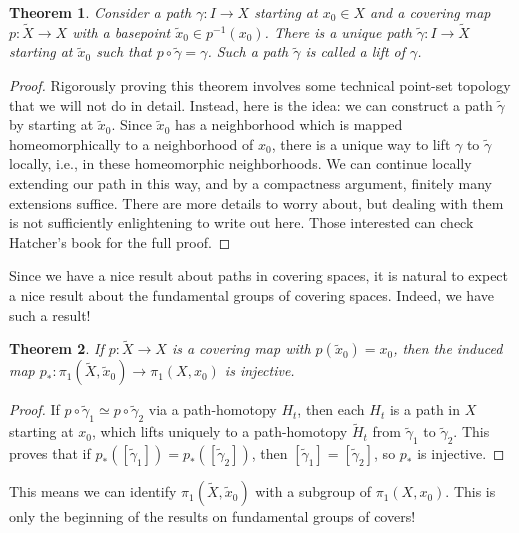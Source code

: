 \documentclass{article}
\newtheorem{thm}{Theorem}[section]
\theoremstyle{definition}
\theoremstyle{remark}
\numberwithin{figure}{section}
\begin{document}
\begin{thm}\label{thm:path lifting}
	Consider a path $\gamma : I \to X$ starting at $x_0 \in X$ and a covering map $p : \tilde X \to X$ with a basepoint $\tilde x_0 \in p^{-1}(x_0)$. There is a unique path $\tilde\gamma : I \to \tilde X$ starting at $\tilde x_0$ such that $p \circ \tilde\gamma = \gamma$. Such a path $\tilde\gamma$ is called a \emph{lift} of $\gamma$.
\end{thm}

\begin{proof}
	Rigorously proving this theorem involves some technical point-set topology that we will not do in detail. Instead, here is the idea: we can construct a path $\tilde\gamma$ by starting at $\tilde x_0$. Since $\tilde x_0$ has a neighborhood which is mapped homeomorphically to a neighborhood of $x_0$, there is a unique way to lift $\gamma$ to $\tilde\gamma$ locally, i.e., in these homeomorphic neighborhoods. We can continue locally extending our path in this way, and by a compactness argument, finitely many extensions suffice. There are more details to worry about, but dealing with them is not sufficiently enlightening to write out here. Those interested can check Hatcher's book for the full proof.
\end{proof}

Since we have a nice result about paths in covering spaces, it is natural to expect a nice result about the fundamental groups of covering spaces. Indeed, we have such a result!

\begin{thm}
	If $p : \tilde X \to X$ is a covering map with $p(\tilde x_0) = x_0$, then the induced map $p_* : \pi_1(\tilde X, \tilde x_0) \to \pi_1(X, x_0)$ is injective.
\end{thm}

\begin{proof}
	If $p \circ \tilde\gamma_1 \simeq p \circ \tilde\gamma_2$ via a path-homotopy $H_t$, then each $H_t$ is a path in $X$ starting at $x_0$, which lifts uniquely to a path-homotopy $\tilde H_t$ from $\tilde\gamma_1$ to $\tilde\gamma_2$. This proves that if $p_*([\tilde\gamma_1]) = p_*([\tilde\gamma_2])$, then $[\tilde\gamma_1] = [\tilde\gamma_2]$, so $p_*$ is injective.
\end{proof}

This means we can identify $\pi_1(\tilde X, \tilde x_0)$ with a subgroup of $\pi_1(X, x_0)$. This is only the beginning of the results on fundamental groups of covers!
\end{document}

